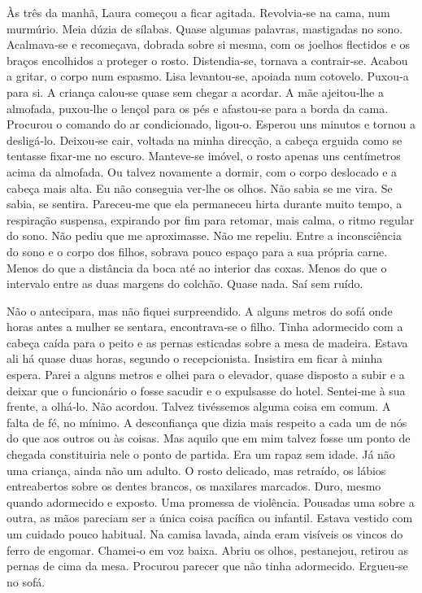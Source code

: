 Às três da manhã, Laura começou a ficar agitada. Revolvia­‑se na cama,
num murmúrio. Meia dúzia de sílabas. Quase algumas palavras, mastigadas
no sono. Acalmava­‑se e recomeçava, dobrada sobre si mesma, com os
joelhos flectidos e os braços encolhidos a proteger o rosto.
Distendia­‑se, tornava a contrair­‑se. Acabou a gritar, o corpo num
espasmo. Lisa levantou­‑se, apoiada num cotovelo. Puxou­‑a para si. A
criança calou­‑se quase sem chegar a acordar. A mãe ajeitou­‑lhe a
almofada, puxou­‑lhe o lençol para os pés e afastou­‑se para a borda da
cama. Procurou o comando do ar condicionado, ligou­‑o. Esperou uns
minutos e tornou a desligá­‑lo. Deixou­‑se cair, voltada na minha
direcção, a cabeça erguida como se tentasse fixar­‑me no escuro.
Manteve­‑se imóvel, o rosto apenas uns centímetros acima da almofada. Ou
talvez novamente a dormir, com o corpo deslocado e a cabeça mais alta.
Eu não conseguia ver­‑lhe os olhos. Não sabia se me vira. Se sabia, se
sentira. Pareceu­‑me que ela permaneceu hirta durante muito tempo, a
respiração suspensa, expirando por fim para retomar, mais calma, o ritmo
regular do sono. Não pediu que me aproximasse. Não me repeliu. Entre a
inconsciência do sono e o corpo dos filhos, sobrava pouco espaço para a
sua própria carne. Menos do que a distância da boca até ao interior das
coxas. Menos do que o intervalo entre as duas margens do colchão. Quase
nada. Saí sem ruído.

Não o antecipara, mas não fiquei surpreendido. A alguns metros do sofá
onde horas antes a mulher se sentara, encontrava­‑se o filho. Tinha
adormecido com a cabeça caída para o peito e as pernas esticadas sobre a
mesa de madeira. Estava ali há quase duas horas, segundo o
recepcionista. Insistira em ficar à minha espera. Parei a alguns metros
e olhei para o elevador, quase disposto a subir e a deixar que o
funcionário o fosse sacudir e o expulsasse do hotel. Sentei­‑me à sua
frente, a olhá­‑lo. Não acordou. Talvez tivéssemos alguma coisa em
comum. A falta de fé, no mínimo. A desconfiança que dizia mais respeito
a cada um de nós do que aos outros ou às coisas. Mas aquilo que em mim
talvez fosse um ponto de chegada constituiria nele o ponto de partida.
Era um rapaz sem idade. Já não uma criança, ainda não um adulto. O rosto
delicado, mas retraído, os lábios entreabertos sobre os dentes brancos,
os maxilares marcados. Duro, mesmo quando adormecido e exposto. Uma
promessa de violência. Pousadas uma sobre a outra, as mãos pareciam ser
a única coisa pacífica ou infantil. Estava vestido com um cuidado pouco
habitual. Na camisa lavada, ainda eram visíveis os vincos do ferro de
engomar. Chamei­‑o em voz baixa. Abriu os olhos, pestanejou, retirou as
pernas de cima da mesa. Procurou parecer que não tinha adormecido.
Ergueu­‑se no sofá.

